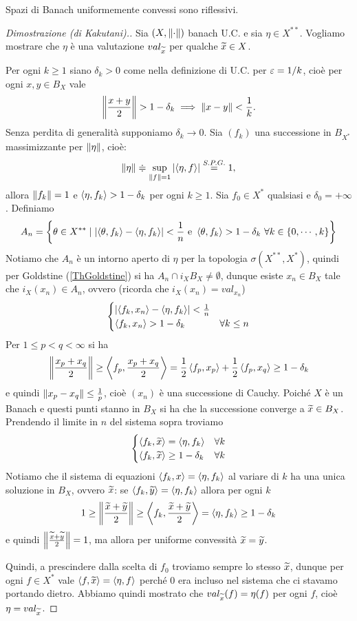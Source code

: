 \begin{theorem}\label{ThMilmanPettis}
Spazi di Banach uniformemente convessi sono riflessivi.
\end{theorem}
\begin{proof}[Dimostrazione (di Kakutani).]
Sia $(X,{\left\Vert{\cdot}\right\Vert})$ banach U.C. e sia $\eta\in X^{\ast\ast}$. Vogliamo mostrare che $\eta$ \`e una valutazione $val_{\widetilde{x}}$ per qualche $\widetilde{x}\in X$.

Per ogni $k\geq 1$ siano $\delta_k>0$ come nella definizione di U.C. per $\varepsilon=1/k$, cio\`e per ogni $x,y\in B_X$ vale
\[\left\Vert{\frac{x+y}2}\right\Vert>1-\delta_k\implies \left\Vert{x-y}\right\Vert<\frac1k.\]
Senza perdita di generalit\`a supponiamo $\delta_k\to 0$. Sia $(f_k)$ una successione in $B_{X^\ast}$ massimizzante per $\left\Vert{\eta}\right\Vert$, cio\`e:
\[\left\Vert{\eta}\right\Vert\doteqdot \sup_{\left\Vert{f}\right\Vert=1}\left|{\left\langle {\eta,f}\right\rangle}\right|\overset{S.P.G.}=1,\]
allora $\left\Vert{f_k}\right\Vert=1$ e $\left\langle {\eta,f_k}\right\rangle>1-\delta_k$ per ogni $k\geq 1$.
Sia $f_0\in X^\ast$ qualsiasi e $\delta_0=+\infty$. Definiamo
\[A_n=\left\{{\theta\in X^{\ast\ast}\mid \left|{\left\langle {\theta,f_k}\right\rangle-\left\langle {\eta,f_k}\right\rangle}\right|<\frac1n\ \text{e }\left\langle {\theta,f_k}\right\rangle>1-\delta_k\ \forall k\in\left\{{0,\cdots,k}\right\}}\right\}\]
Notiamo che $A_n$ \`e un intorno aperto di $\eta$ per la topologia $\sigma(X^{\ast\ast},X^\ast)$, quindi per Goldstine (\ref{ThGoldstine}) si ha $A_n\cap i_X B_X\neq \emptyset$, dunque esiste $x_n\in B_X$ tale che $i_X(x_n)\in A_n$, ovvero (ricorda che $i_X(x_n)=val_{x_n}$)
\[\begin{cases}
\left|{\left\langle {f_k,x_n}\right\rangle-\left\langle {\eta,f_k}\right\rangle}\right|<\frac1n&\\
\left\langle {f_k,x_n}\right\rangle>1-\delta_k &\forall k\leq n
\end{cases}\]
Per $1\leq p<q<\infty$ si ha
\[\left\Vert{\frac{x_p+x_q}2}\right\Vert\geq \left\langle {f_p,\frac{x_p+x_q}2}\right\rangle=\frac12\left\langle {f_p,x_p}\right\rangle+\frac12\left\langle {f_p,x_q}\right\rangle\geq 1-\delta_k\]
e quindi $\left\Vert{x_p-x_q}\right\Vert\leq \frac1p$, cio\`e $(x_n)$ \`e una successione di Cauchy. Poich\'e $X$ \`e un Banach e questi punti stanno in $B_X$ si ha che la successione converge a $\widetilde{x}\in B_X$. Prendendo il limite in $n$ del sistema sopra troviamo 
\[\begin{cases}
\left\langle {f_k,\widetilde{x}}\right\rangle=\left\langle {\eta,f_k}\right\rangle&\forall k\\
\left\langle {f_k,\widetilde{x}}\right\rangle\geq 1-\delta_k &\forall k
\end{cases}\]
Notiamo che il sistema di equazioni $\left\langle {f_k,x}\right\rangle=\left\langle {\eta,f_k}\right\rangle$ al variare di $k$ ha una unica soluzione in $B_X$, ovvero $\widetilde{x}$: se $\left\langle {f_k,\widetilde{y}}\right\rangle=\left\langle {\eta,f_k}\right\rangle$ allora per ogni $k$
\[1\geq \left\Vert{\frac{\widetilde{x}+\widetilde{y}}2}\right\Vert\geq \left\langle {f_k,\frac{\widetilde{x}+\widetilde{y}}2}\right\rangle=\left\langle {\eta,f_k}\right\rangle\geq 1-\delta_k\]
e quindi $\left\Vert{\frac{\widetilde{x}+\widetilde{y}}2}\right\Vert=1$, ma allora per uniforme convessit\`a $\widetilde{x}=\widetilde{y}$.

Quindi, a prescindere dalla scelta di $f_0$ troviamo sempre lo stesso $\widetilde{x}$, dunque per ogni $f\in X^\ast$ vale $\left\langle {f,\widetilde{x}}\right\rangle=\left\langle {\eta,f}\right\rangle$ perch\'e $0$ era incluso nel sistema che ci stavamo portando dietro. Abbiamo quindi mostrato che $val_{\widetilde{x}}(f)=\eta(f)$ per ogni $f$, cio\`e $\eta=val_{\widetilde{x}}$.
\end{proof}
